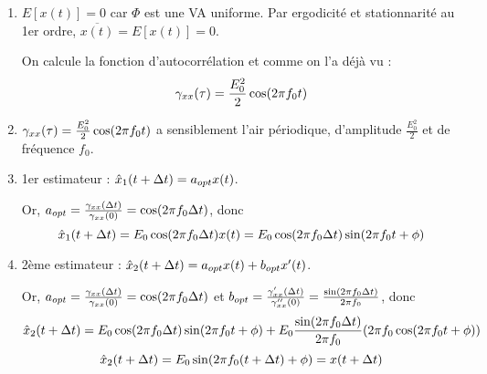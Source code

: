 \documentclass[main.tex]{subfiles}
\begin{document}
\begin{enumerate}\setlength{\itemsep}{5mm}
\item $E[x(t)] = 0$ car $\Phi$ est une VA uniforme. Par ergodicité et stationnarité au 1er ordre, $\overline{x(t)} = E[x(t)] = 0$.

On calcule la fonction d'autocorrélation et comme on l'a déjà vu :
\[ \gamma_{xx}(\tau) = \frac{E_0^2}{2}\cos(2\pi f_0 t) \]

\item $\gamma_{xx}(\tau)=\frac{E_0^2}{2}\cos(2\pi f_0 t)$ a sensiblement l'air périodique, d'amplitude $\frac{E_0^2}{2}$ et de fréquence $f_0$.

\item 1er estimateur : $\hat{x}_1(t+\Delta t) = a_{opt}x(t)$. 

Or, $a_{opt} = \frac{\gamma_{xx}(\Delta t)}{\gamma_{xx}(0)} = \cos(2\pi f_0 \Delta t)$, donc
\[ \hat{x}_1(t+\Delta t)= E_0 \cos(2\pi f_0 \Delta t)x(t) = E_0 \cos(2\pi f_0 \Delta t) \sin(2\pi f_0 t + \phi) \]

\item 2ème estimateur : $\hat{x}_2(t+\Delta t) = a_{opt}x(t) + b_{opt}x'(t)$. 

Or, $a_{opt} = \frac{\gamma_{xx}(\Delta t)}{\gamma_{xx}(0)} = \cos(2\pi f_0 \Delta t)$ et 
$b_{opt} = \frac{\gamma_{xx}'(\Delta t)}{\gamma_{xx}''(0)} = \frac{\sin(2\pi f_0 \Delta t)}{2\pi f_0}$, donc
\[ \hat{x}_2(t+\Delta t) = E_0 \cos(2\pi f_0 \Delta t) \sin(2\pi f_0 t + \phi) + E_0 \frac{\sin(2\pi f_0 \Delta t)}{2\pi f_0} (2\pi f_0 \cos(2\pi f_0 t + \phi)) \]
\[ \hat{x}_2(t+\Delta t) = E_0\sin(2\pi f_0(t+\Delta t) + \phi) = x(t+\Delta t)\]
\end{enumerate}
\end{document}
